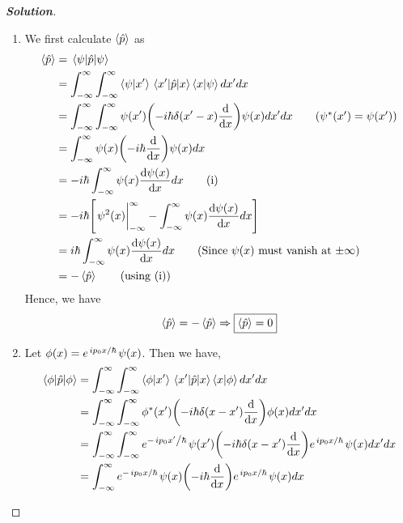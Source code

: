\documentclass[10pt]{scrartcl}
\theoremstyle{definition}
\newenvironment{solution} {\begin{proof}[\normalfont \textbf{Solution}]} {\end{proof}}
\newcommand*{\Op}{\hat{p}}
\begin{document}
\begin{solution}
    $ $
    \begin{enumerate}[label=(\alph*)]
        \item We first calculate $\expval{\Op}$ as
            \begin{align*}
                \expval{\Op} &= \ev{\Op}{\psi} \\ 
                             &= \int_{-\infty}^{\infty} \int_{-\infty}^{\infty} \ip{\psi}{x'} \mel{x'}{\Op}{x} \ip{x}{\psi} dx'dx \\ 
                             &= \int_{-\infty}^{\infty} \int_{-\infty}^{\infty} \psi(x') \qty(-i\hbar \delta(x' - x)\dv{x}) \psi(x) dx'dx \tag{$\psi^*(x') = \psi(x')$}\\ 
                             &= \int_{-\infty}^{\infty} \psi(x) \qty(-i\hbar \dv{x}) \psi(x) dx \\ 
                             &= -i\hbar \int_{-\infty}^{\infty} \psi(x) \dv{\psi(x)}{x} dx \tag{i}\\ 
                             &= -i\hbar \qty[ \eval{\psi^2(x)}_{-\infty}^{\infty} - \int_{-\infty}^{\infty} \psi(x) \dv{\psi(x)}{x} dx] \\ 
                             &= i\hbar \int_{-\infty}^{\infty} \psi(x) \dv{\psi(x)}{x} dx  \tag{Since $\psi(x)$ must vanish at $\pm \infty$}\\
                             &= -\expval{\Op} \tag{using (i)} \\
            \end{align*}
            Hence, we have $$\expval{\Op} = - \expval{\Op} \Rightarrow \boxed{\expval{\Op} = 0}$$
        \item Let $\phi(x) = e^{\flatfrac{ip_0x}{\hbar}}\psi(x)$. Then we have,
            \begin{align*}
                \ev{\Op}{\phi}  &= \int_{-\infty}^{\infty} \int_{-\infty}^{\infty} \ip{\phi}{x'} \mel{x'}{\Op}{x} \ip{x}{\phi} dx'dx \\ 
                                &= \int_{-\infty}^{\infty} \int_{-\infty}^{\infty} \phi^*(x') \qty(-i\hbar \delta(x - x')\dv{x}) \phi(x) dx'dx \\ 
                                &= \int_{-\infty}^{\infty} \int_{-\infty}^{\infty} e^{-\flatfrac{ip_0x'}{\hbar}}\psi(x') \qty(-i\hbar \delta(x - x')\dv{x}) e^{\flatfrac{ip_0x}{\hbar}}\psi(x) dx'dx \\ 
                                &= \int_{-\infty}^{\infty}  e^{-\flatfrac{ip_0x}{\hbar}}\psi(x) \qty(-i\hbar \dv{x}) e^{\flatfrac{ip_0x}{\hbar}}\psi(x) dx \\ 

\end{align*}
\end{enumerate}
\end{solution}
\end{document}
